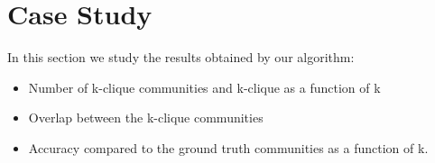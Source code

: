 \section{Case Study}
\label{sec:casestudy}

In this section we study the results obtained by our algorithm:
\begin{itemize}
\item Number of k-clique communities and k-clique as a function of k
\item Overlap between the k-clique communities
\item Accuracy compared to the ground truth communities as a function of k.
\end{itemize}




